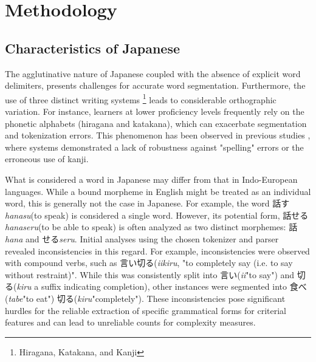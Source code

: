 \chapter{Methodology}
\section{Characteristics of Japanese}

The agglutinative nature of Japanese coupled with the absence of explicit word delimiters, presents challenges for
accurate word segmentation. Furthermore, the use of three distinct writing systems
\footnote{Hiragana, Katakana, and Kanji} leads to considerable orthographic variation. For instance, learners at
lower proficiency levels frequently rely on the phonetic alphabets (hiragana and katakana), which can exacerbate
segmentation and tokenization errors. This phenomenon has been observed in previous studies
\citep{yang1998, nagata2009}, where systems demonstrated a lack of robustness against "spelling" errors or the
erroneous use of kanji.

What is considered a word in Japanese may differ from that in Indo-European languages. While a bound morpheme in
English might be treated
as an individual word, this is generally not the case in Japanese. For example, the word 話す\textit{hanasu}(to speak)
is considered a single word. However, its potential form, 話せる \textit{hanaseru}(to be able to speak) is often
analyzed as
two distinct morphemes: 話\textit{hana} and せる\textit{seru}. Initial analyses using the chosen tokenizer and parser
revealed inconsistencies in this regard. For example, inconsistencies were observed with compound verbs, such as
言い切る(\textit{iikiru}, "to completely say (i.e. to say without restraint)". While this was
consistently
split into 言い(\textit{ii}"to say") and 切る(\textit{kiru} a suffix indicating completion), other instances were
segmented into
食べ (\textit{tabe}"to eat") 切る(\textit{kiru}"completely"). These inconsistencies pose significant hurdles for the
reliable extraction of specific grammatical forms for criterial features and can lead to unreliable counts for
complexity measures.

